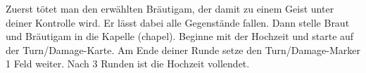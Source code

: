 
      \begin{itemize}
            \bitem Zuerst tötet man den erwählten Bräutigam, der damit zu einem Geist unter deiner Kontrolle wird. Er lässt dabei alle Gegenstände fallen.
            \bitem Dann stelle Braut und Bräutigam in die Kapelle (chapel).
            \bitem Beginne mit der Hochzeit und starte auf der Turn/Damage-Karte.
            \bitem Am Ende deiner Runde setze den Turn/Damage-Marker 1 Feld weiter.
  Nach 3 Runden ist die Hochzeit vollendet.

        \end{itemize}



